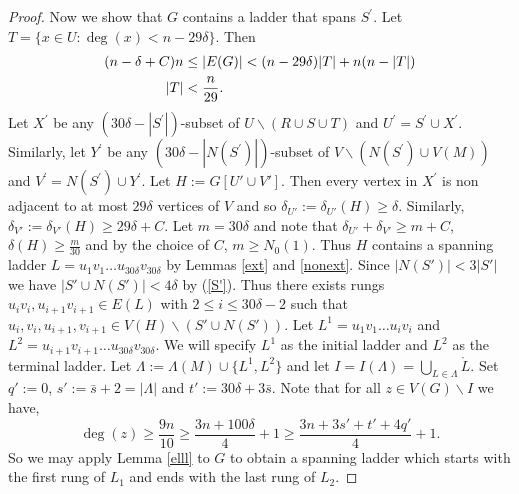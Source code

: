 \documentclass[oneside,12pt]{memoir}
\newcommand{\ssm}{\smallsetminus}
\begin{document}
\begin{proof}
Now we show that $G$ contains a ladder that spans $S^{\prime}$.
Let $T=\{x\in U:\deg(x)< n-29\delta\}$. Then 
\begin{align}
(n-\delta+C)n &\leq|E(G)| <(n-29\delta)|T|+n(n-|T| )\notag \\
|T|&<\frac{n}{29}\notag.
\end{align}
Let $X^{\prime}$ be any $(30\delta-|S^{\prime}|)$-subset
of $U\ssm (R\cup S\cup T)$ and $U^{\prime}=S^{\prime}\cup X^{\prime}$. Similarly,
let $Y^{\prime}$ be any $(30\delta-\left\vert N(S^{\prime})\right\vert )$-subset
of $V\ssm (N\left(S^{\prime}\right)\cup V(M))$ and $V^{\prime}=N(S^{\prime})\cup Y^{\prime}$.
Let $H:=G[U'\cup V']$.  Then every vertex in $X^{\prime}$ is non adjacent to at most $29\delta$
vertices of $V$ and so $\delta_{U'}:=\delta_{U'}(H)\geq\delta$. Similarly, $\delta_{V'}:=\delta_{V'}(H)\geq 29\delta+C$. Let $m=30\delta$ and note that $\delta_{U'}+\delta_{V'}\geq m+C$, $\delta(H)\geq\frac{m}{30}$ and by the choice of $C$, $m\geq N_0(1)$.  Thus $H$ contains a spanning ladder $L=u_1v_1\dots u_{30\delta}v_{30\delta}$ by Lemmas \ref{ext} and \ref{nonext}. Since $|N(S')|<3|S'|$ we have $|S'\cup N(S')|<4\delta$ by (\ref{S'}). Thus there exists rungs $u_iv_i,u_{i+1}v_{i+1}\in E(L)$ with $2\leq i\leq 30\delta-2$ such that $u_i,v_i,u_{i+1},v_{i+1}\in V(H)\ssm (S'\cup N(S'))$.  Let $L^1=u_1v_1\dots u_iv_i$ and $L^2=u_{i+1}v_{i+1}\dots u_{30\delta}v_{30\delta}$.  We will specify $L^1$ as the initial ladder and $L^2$ as the terminal ladder.  Let $\Lambda:=\Lambda(M)\cup\{L^1,L^2\}$ and let $I=I(\Lambda)=\bigcup_{L\in \Lambda}\mathring{L}$. Set $q':=0$, $s':=\bar{s}+2=|\Lambda|$ and $t':= 30\delta+3\bar{s}$. Note that for all $z\in V(G)\ssm I$ we have,
\[
\deg(z)\geq \frac{9n}{10}\geq \frac{3n+100\delta}{4}+1 \geq\frac{3n+3s'+t'+4q'}{4}+1.
\]
So we may apply Lemma \ref{elll} to $G$ to obtain a spanning ladder which starts with the first rung of $L_1$ and ends with the last rung of $L_2$.


\end{proof}
\end{document}
